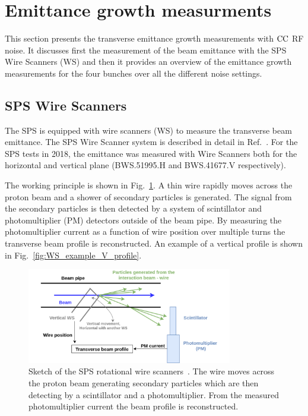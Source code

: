 \section{Emittance growth measurments}\label{sec:emit_growth_meas_2018}
This section presents the transverse emittance growth measurements with ${\mathrm{CC}}$ RF noise. It discusses first the measurement of the beam emittance with the SPS Wire Scanners (WS) and then it provides an overview of the emittance growth measurements for the four bunches over all the different noise settings.

\subsection{SPS Wire Scanners}\label{subsec:sps_ws}
The SPS is equipped with wire scanners (WS) to measure the transverse beam emittance. The SPS Wire Scanner system is described in detail in Ref.~\cite{BOSSER1985475, Berrig:1972478}. For the SPS tests in 2018, the emittance was measured with Wire Scanners both for the horizontal and vertical plane (BWS.51995.H and BWS.41677.V respectively).

The working principle is shown in Fig.~\ref{fig:SPS_WS_ROT}. A thin wire rapidly moves across the proton beam and a shower of secondary particles is generated. The signal from the secondary particles is then detected by a system of scintillator and photomultiplier (PM) detectors outside of the beam pipe. By measuring the photomultiplier current as a function of wire position over multiple turns the transverse beam profile is reconstructed. An example of a vertical profile is shown in Fig.~\ref{fig:WS_example_V_profile}.

\begin{figure}[!h]
   \centering         
   \includegraphics[width=0.8\textwidth]{images/Ch5/Wire_scanner.png}
       \caption{Sketch of the SPS rotational wire scanners~\cite{Berrig:1972478}. The wire moves across the proton beam generating secondary particles which are then detecting by a scintillator and a photomultiplier. From the measured photomultiplier current the beam profile is reconstructed.}
       \label{fig:SPS_WS_ROT}
\end{figure}
